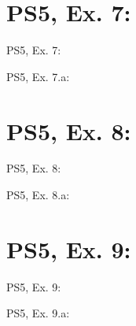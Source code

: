 \section{PS5, Ex. 7: }

\begin{frame}{PS5, Ex. 7: }
  \begin{multicols}{2}
    \vfill\null \columnbreak
    \vfill\null
  \end{multicols}
\end{frame}

\begin{frame}{PS5, Ex. 7.a: }
  \begin{multicols}{2}
    \vfill\null \columnbreak
    \vfill\null
  \end{multicols}
\end{frame}



\section{PS5, Ex. 8: }

\begin{frame}{PS5, Ex. 8: }
  \begin{multicols}{2}
    \vfill\null \columnbreak
    \vfill\null
  \end{multicols}
\end{frame}

\begin{frame}{PS5, Ex. 8.a: }
  \begin{multicols}{2}
    \vfill\null \columnbreak
    \vfill\null
  \end{multicols}
\end{frame}



\section{PS5, Ex. 9: }

\begin{frame}{PS5, Ex. 9: }
  \begin{multicols}{2}
    \vfill\null \columnbreak
    \vfill\null
  \end{multicols}
\end{frame}

\begin{frame}{PS5, Ex. 9.a: }
  \begin{multicols}{2}
    \vfill\null \columnbreak
    \vfill\null
  \end{multicols}
\end{frame}



